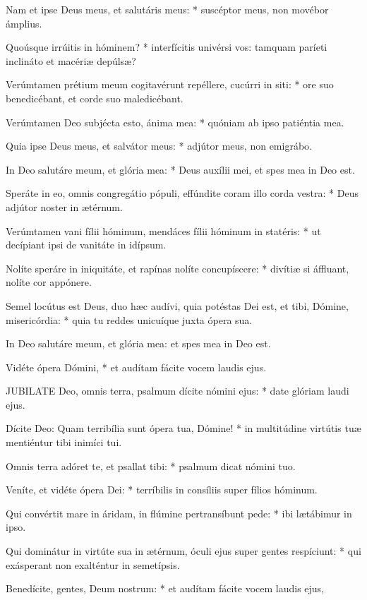 Nam et ipse Deus meus, et salutáris meus: * suscéptor meus, non movébor ámplius.

Quoúsque irrúitis in hóminem? * interfícitis univérsi vos: tamquam paríeti inclináto et macériæ depúlsæ?

Verúmtamen prétium meum cogitavérunt repéllere, cucúrri in siti: * ore suo benedicébant, et corde suo maledicébant.

Verúmtamen Deo subjécta esto, ánima mea: * quóniam ab ipso patiéntia mea.

Quia ipse Deus meus, et salvátor meus: * adjútor meus, non emigrábo.

In Deo salutáre meum, et glória mea: * Deus auxílii mei, et spes mea in Deo est.

Speráte in eo, omnis congregátio pópuli, effúndite coram illo corda vestra: * Deus adjútor noster in ætérnum.

Verúmtamen vani fílii hóminum, mendáces fílii hóminum in statéris: * ut decípiant ipsi de vanitáte in idípsum.

Nolíte speráre in iniquitáte, et rapínas nolíte concupíscere: * divítiæ si áffluant, nolíte cor appónere.

Semel locútus est Deus, duo hæc audívi, quia potéstas Dei est, et tibi, Dómine, misericórdia: * quia tu reddes unicuíque juxta ópera sua.

 In Deo salutáre meum, et glória mea: et spes mea in Deo est.

 Vidéte ópera Dómini, * et audítam fácite vocem laudis ejus.


\lettrine[lines=2]{J}{UBILATE} Deo, omnis terra, psalmum dícite nómini ejus: * date glóriam laudi ejus.

Dícite Deo: Quam terribília sunt ópera tua, Dómine! * in multitúdine virtútis tuæ mentiéntur tibi inimíci tui.

Omnis terra adóret te, et psallat tibi: * psalmum dicat nómini tuo.

Veníte, et vidéte ópera Dei: * terríbilis in consíliis super fílios hóminum.

Qui convértit mare in áridam, in flúmine pertransíbunt pede: * ibi lætábimur in ipso.

Qui dominátur in virtúte sua in ætérnum, óculi ejus super gentes respíciunt: * qui exásperant non exalténtur in semetípsis.

Benedícite, gentes, Deum nostrum: * et audítam fácite vocem laudis ejus,

